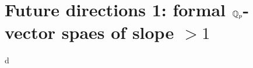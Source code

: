
\section{Future directions 1: formal \texorpdfstring{$\mathbb{Q}_p$}{Qp}-vector spaes of slope \texorpdfstring{$>1$}{>1}}





d

